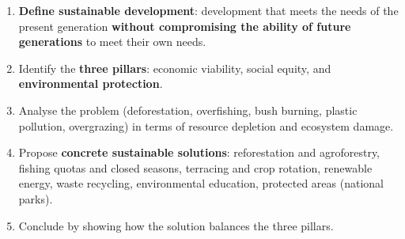 \documentclass[11pt]{article}
\begin{document}
\begin{methode}
\begin{enumerate}
\item \textbf{Define sustainable development}: development that meets the needs of the present generation \textbf{without compromising the ability of future generations} to meet their own needs.
\item Identify the \textbf{three pillars}: economic viability, social equity, and \textbf{environmental protection}.
\item Analyse the problem (deforestation, overfishing, bush burning, plastic pollution, overgrazing) in terms of resource depletion and ecosystem damage.
\item Propose \textbf{concrete sustainable solutions}: reforestation and agroforestry, fishing quotas and closed seasons, terracing and crop rotation, renewable energy, waste recycling, environmental education, protected areas (national parks).
\item Conclude by showing how the solution balances the three pillars.
\end{enumerate}
\end{methode}
\end{document}
